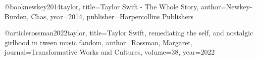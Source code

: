 @book{newkey2014taylor,
  title={Taylor Swift - The Whole Story},
  author={Newkey-Burden, Chas},
  year={2014},
  publisher={Harpercollins Publishers}
}

@article{rossman2022taylor,
  title={Taylor Swift, remediating the self, and nostalgic girlhood in tween music fandom},
  author={Rossman, Margaret},
  journal={Transformative Works and Cultures},
  volume={38},
  year={2022}
}
